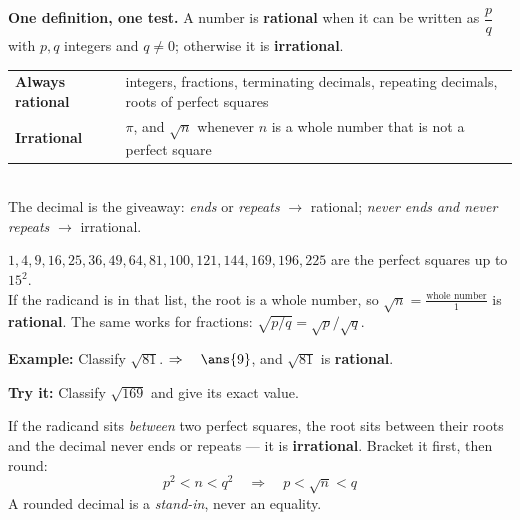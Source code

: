 \documentclass[12pt]{article}
\begin{document}

\begin{formulabox}
\textbf{One definition, one test.} A number is \textbf{rational} when it can be
written as $\dfrac{p}{q}$ with $p,q$ integers and $q \neq 0$; otherwise it is
\textbf{irrational}.\\[3pt]
\begin{tabular}{@{}p{5.3cm}p{9.3cm}@{}}
\textbf{Always rational} & integers, fractions, terminating decimals,
repeating decimals, roots of perfect squares \\[2pt]
\textbf{Irrational} & $\pi$, and $\sqrt{n}$ whenever $n$ is a whole number that
is not a perfect square \\
\end{tabular}\\[3pt]
The decimal is the giveaway: \emph{ends} or \emph{repeats} $\rightarrow$
rational; \emph{never ends and never repeats} $\rightarrow$ irrational.
\end{formulabox}


\begin{formulabox}
$1, 4, 9, 16, 25, 36, 49, 64, 81, 100, 121, 144, 169, 196, 225$ are the perfect
squares up to $15^2$.\\[2pt]
If the radicand is in that list, the root is a whole number, so
$\sqrt{n} = \frac{\text{whole number}}{1}$ is \textbf{rational}. The same works
for fractions: $\sqrt{p/q} = \sqrt{p}/\sqrt{q}$.
\end{formulabox}

\begin{examplebox}
\textbf{Example:} Classify $\sqrt{81}$.
$\Rightarrow\quad \ans{9}$, and $\sqrt{81}$ is \textbf{rational}.
\end{examplebox}

\begin{tryitbox}
\textbf{Try it:} Classify $\sqrt{169}$ and give its exact value.\\[2pt]
\end{tryitbox}


\begin{formulabox}
If the radicand sits \emph{between} two perfect squares, the root sits between
their roots and the decimal never ends or repeats --- it is
\textbf{irrational}. Bracket it first, then round:
\[ p^2 < n < q^2 \quad\Longrightarrow\quad p < \sqrt{n} < q \]
A rounded decimal is a \emph{stand-in}, never an equality.
\end{formulabox}
\end{document}

